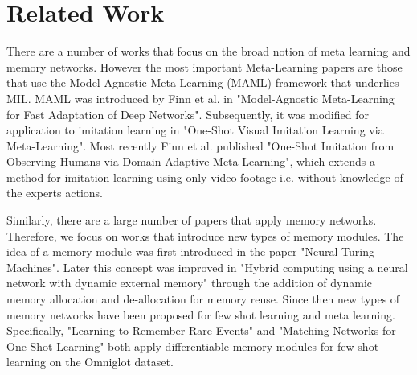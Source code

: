 \section{Related Work}
There are a number of works that focus on the broad notion of meta learning and memory networks.
However the most important Meta-Learning papers are those that use the Model-Agnostic Meta-Learning (MAML)
framework that underlies MIL. MAML was introduced by Finn et al. in "Model-Agnostic Meta-Learning for
Fast Adaptation of Deep Networks". Subsequently, it was modified
for application to imitation learning in "One-Shot Visual Imitation Learning via Meta-Learning". 
Most recently Finn et al. published "One-Shot Imitation from Observing Humans via Domain-Adaptive Meta-Learning", which extends
a method for imitation learning using only video footage 
i.e. without knowledge of the experts actions.

Similarly, there are a large number of papers that apply memory networks. Therefore, we focus on
works that introduce new types of memory modules. The idea of a memory module was first introduced in
the paper "Neural Turing Machines". Later this concept was improved in "Hybrid computing using a neural network with dynamic external memory" 
through the addition of dynamic memory allocation and de-allocation for memory reuse. Since then
new types of memory networks have been proposed for few shot learning and meta learning. Specifically, 
"Learning to Remember Rare Events" and "Matching Networks for One Shot Learning" both apply
differentiable memory modules for few shot learning on the Omniglot dataset.
